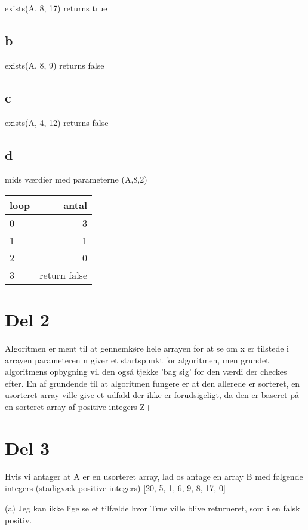 \documentclass{report}
\begin{document}
exists(A, 8, 17)\newline
         returns true
\section{b}
exists(A, 8, 9)\newline
        returns false

\section{c}
exists(A, 4, 12)\newline
        returns false 

\section{d}

mids værdier med parameterne (A,8,2)\newline
\begin{tabular}{l | r}
	loop & antal \\ \hline
	\hline
	0 &  3 \\ \hline
	1 &  1 \\ \hline
	2 &  0 \\ \hline
	3 &  return false\\
	\hline
\end{tabular}


\chapter{Del 2}
Algoritmen er ment til at gennemkøre hele arrayen for at se om x er tilstede i arrayen
parameteren n giver et startspunkt for algoritmen, men grundet algoritmens opbygning vil den også tjekke 'bag sig' for den værdi der checkes efter. En af grundende til at algoritmen fungere er at den allerede er sorteret, en usorteret array ville give et udfald der ikke er forudsigeligt, da den er baseret på en sorteret array af positive integers Z+

\chapter{Del 3}
Hvis vi antager at A er en usorteret array, lad os antage en array B med følgende integers (stadigvæk positive integers) [20, 5, 1, 6, 9, 8, 17, 0]

(a) Jeg kan ikke lige se et tilfælde hvor True ville blive returneret, som i en falsk positiv.
\end{document}
